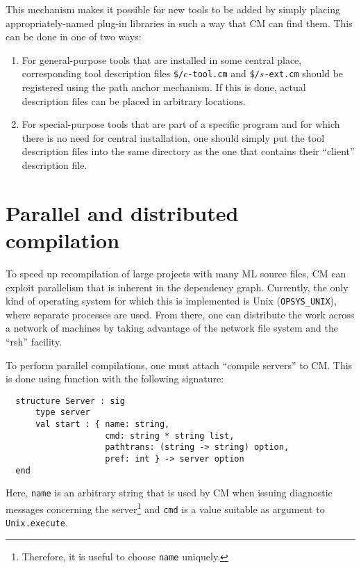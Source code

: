 \documentclass[titlepage,letterpaper]{article}
\begin{document}
This mechanism makes it possible for new tools to be added by simply
placing appropriately-named plug-in libraries in such a way that CM
can find them.  This can be done in one of two ways:

\begin{enumerate}
\item For general-purpose tools that are installed in some central
place, corresponding tool description files {\tt \$/}$c${\tt -tool.cm}
and {\tt \$/}$s${\tt -ext.cm} should be registered using the path
anchor mechanism.  If this is done, actual description files can be
placed in arbitrary locations.
\item For special-purpose tools that are part of a specific program
and for which there is no need for central installation, one should
simply put the tool description files into the same directory as the
one that contains their ``client'' description file.
\end{enumerate}

\section{Parallel and distributed compilation}
\label{sec:parmake}

To speed up recompilation of large projects with many ML source files,
CM can exploit parallelism that is inherent in the dependency graph.
Currently, the only kind of operating system for which this is
implemented is Unix ({\tt OPSYS\_UNIX}), where separate processes are
used.  From there, one can distribute the work across a network of
machines by taking advantage of the network file system and the
``rsh'' facility.

To perform parallel compilations, one must attach ``compile servers''
to CM.  This is done using function
with the following signature:

\begin{verbatim}
  structure Server : sig
      type server
      val start : { name: string,
                    cmd: string * string list,
                    pathtrans: (string -> string) option,
                    pref: int } -> server option
  end
\end{verbatim}

Here, {\tt name} is an arbitrary string that is used by CM when
issuing diagnostic messages concerning the server\footnote{Therefore,
it is useful to choose {\tt name} uniquely.} and {\tt cmd} is a value
suitable as argument to {\tt Unix.execute}.
\end{document}
